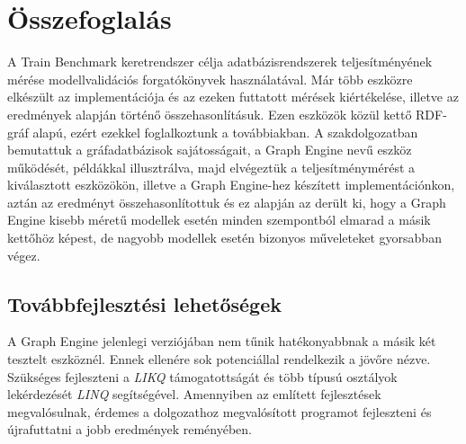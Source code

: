 \chapter{Összefoglalás}

A Train Benchmark\cite{Szárnyas2017} keretrendszer célja adatbázisrendszerek teljesítményének mérése modellvalidációs forgatókönyvek használatával. Már több eszközre elkészült az implementációja és az ezeken futtatott mérések kiértékelése, illetve az eredmények alapján történő összehasonlításuk. Ezen eszközök közül kettő RDF-gráf alapú, ezért ezekkel foglalkoztunk a továbbiakban. A szakdolgozatban bemutattuk a gráfadatbázisok sajátosságait, a Graph Engine nevű eszköz működését, példákkal illusztrálva, majd elvégeztük a teljesítménymérést a kiválasztott eszközökön, illetve a Graph Engine-hez készített implementációnkon, aztán az eredményt összehasonlítottuk és ez alapján az derült ki, hogy a Graph Engine kisebb méretű modellek esetén minden szempontból elmarad a másik kettőhöz képest, de nagyobb modellek esetén bizonyos műveleteket gyorsabban végez.

\section{Továbbfejlesztési lehetőségek}

A Graph Engine\cite{GraphEngine} jelenlegi verziójában nem tűnik hatékonyabbnak a másik két tesztelt eszköznél. Ennek ellenére sok potenciállal rendelkezik a jövőre nézve. Szükséges fejleszteni a \emph{LIKQ} támogatottságát és több típusú osztályok lekérdezését \emph{LINQ} segítségével. Amennyiben az említett fejlesztések megvalósulnak, érdemes a dolgozathoz megvalósított programot fejleszteni és újrafuttatni a jobb eredmények reményében.